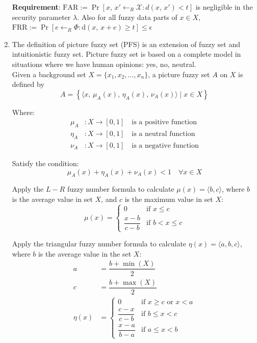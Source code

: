 \documentclass[graybox]{svmult}
\begin{document}
\begin{enumerate}[label=(\roman*), itemsep=1em]
          \textbf{Requirement}: \( \text{FAR} := \Pr[x,\, x' \leftarrow_{{R}} {\mathcal{X}} : d(x,\, x') < t] \) is negligible in the \allowbreak security parameter  \( \lambda \). Also for all fuzzy data parts of \( x \in {X} \), \( \text{FRR} := \Pr[e \leftarrow_{{R}} \varPhi : \mathrm{d}(x, \, x + e) \geq t] \leq \epsilon \)
    \item The definition of picture fuzzy set (PFS) is an extension of fuzzy set and \allowbreak intuitionistic fuzzy set. Picture fuzzy set is based on a complete model in \allowbreak situations where we have human opinions: yes, no, neutral. \\[6pt]
          Given a background set \( X = \{x_1, x_2, \dots, x_n \} \), a picture fuzzy set \( A \) on \( X \) is \allowbreak defined by
          \[
              A = \left\{ \langle x,\, \mu_A(x),\, \eta_A(x),\, \nu_A(x) \rangle \mid x \in X \right\}
          \]

          Where:
          \begin{align*}
              \mu_A  & : X \to [0, 1] \quad \text{is a positive function} \\[6pt]
              \eta_A & : X \to [0, 1] \quad \text{is a neutral function}  \\[6pt]
              \nu_A  & : X \to [0, 1] \quad \text{is a negative function}
          \end{align*}

          Satisfy the condition:
          \[
              \mu_A(x) + \eta_A(x) + \nu_A(x) < 1 \quad \forall x \in X
          \]

          Apply the \( L- R \) fuzzy number formula to calculate \( \mu(x) = \langle b, c \rangle \), where \( b \) is the average value in set \( X \), and \( c \) is the maximum value in set \( X \):
          \[
              \mu(x) = \begin{cases}
                  0                & \text{if } x \leq c     \\
                  \dfrac{x-b}{c-b} & \text{if } b < x \leq c
              \end{cases}
          \]

          Apply the triangular fuzzy number formula to calculate \( \eta(x) = \langle a, b, c \rangle \), where \( b \) is the average value in the set \( X \):
          \begin{align*}
              a       & = \dfrac{b + \min(X)}{2}                                          \\[6pt]
              c       & = \dfrac{b + \max(X)}{2}                                          \\[6pt]
              \eta(x) & = \begin{cases}
                              0                & \text{if } x \geq c \text{ or } x < a \\
                              \dfrac{c-x}{c-b} & \text{if } b \leq x < c               \\[6pt]
                              \dfrac{x-a}{b-a} & \text{if } a \leq x < b
                          \end{cases}
          \end{align*}



\end{enumerate}
\end{document}
